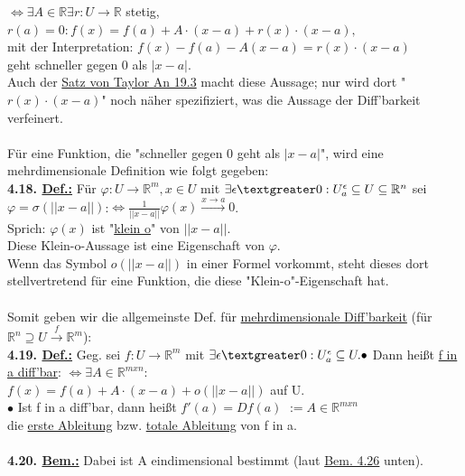 \documentclass[]{scrartcl}
\begin{document}
$\Leftrightarrow \exists A\in\mathbb{R} \exists r:U\rightarrow \mathbb{R}$ 
stetig, $r(a)= 0: f(x)=f(a)+A\cdot(x-a)+r(x)\cdot(x-a),$\\
mit der Interpretation: $f(x)-f(a)-A(x-a)=r(x)\cdot(x-a)$\\
geht schneller gegen 0 als $|x-a|$.\\
Auch der \ul{Satz von  Taylor An 19.3} macht diese Aussage; nur wird dort 
"$r(x)\cdot(x-a)$" noch näher spezifiziert, was die Aussage der Diff'barkeit 
verfeinert.\\
\\
Für eine Funktion, die "schneller gegen 0 geht als $|x-a|$", wird eine 
mehrdimensionale Definition wie folgt gegeben:\\
\textbf{4.18. \underline{Def.:}} Für $\varphi:U\rightarrow\mathbb{R}^m, x\in U$ 
mit $\exists\epsilon\textgreater0:U_a^\epsilon\subseteq U\subseteq\mathbb{R}^n$ 
sei\\
\ul{$\varphi=\sigma(||x-a||)$}:$\Leftrightarrow 
\frac{1}{||x-a||}$\ul{$\varphi(x)\xrightarrow{x\rightarrow 
a}0$}.\\
Sprich: $\varphi(x)$ ist "\underline{klein o}" von $||x-a||$.\\
Diese Klein-o-Aussage ist eine Eigenschaft von $\varphi$.\\
Wenn das Symbol $o(||x-a||)$ in einer Formel vorkommt, steht dieses dort 
stellvertretend für eine Funktion, die diese "Klein-o"-Eigenschaft hat.\\
\\
Somit geben wir die allgemeinste Def. für \underline{mehrdimensionale 
Diff'barkeit} (für $\mathbb{R}^n\supseteq U \xrightarrow{f}\mathbb{R}^m$):\\
\textbf{4.19. \underline{Def.:}} Geg. sei $f:U\rightarrow\mathbb{R}^m$ mit 
$\exists \epsilon\textgreater0: U_a^\epsilon\subseteq U.\\
\bullet$ Dann heißt \ul{f in a diff'bar}: $\Leftrightarrow 
\exists A \in \mathbb{R}^{m x n}$:\\
$f(x)=f(a)+A\cdot(x-a)+o(||x-a||)$ auf U.\\
$\bullet$ Ist f in a diff'bar, dann heißt \ul{$f'(a)=Df(a)$} 
$:=A\in\mathbb{R}^{m x n}$\\
die \ul{erste Ableitung} bzw. \ul{totale Ableitung} von f in 
a.\\
\\
\textbf{4.20. \underline{Bem.:}} Dabei ist A eindimensional bestimmt (laut 
\ul{Bem. 4.26} unten).\\
\end{document}
